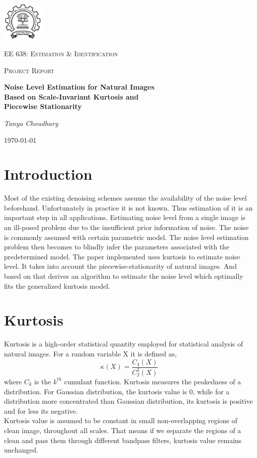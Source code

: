 \documentclass[11pt]{article}
\begin{document}
\begin{titlepage}
	\centering
	\includegraphics[width=0.15\textwidth]{IITBlogo.png}\par\vspace{1cm}
	{\scshape\LARGE EE 638: Estimation \& Identification \par}
	\vspace{1cm}
	{\scshape\Large Project Report\par}
	\vspace{1.5cm}
	{\huge\bfseries Noise Level Estimation for Natural Images\\ Based on Scale-Invariant Kurtosis and\\ Piecewise Stationarity \par}
	\vspace{2cm}
	{\Large\itshape Tanya Choudhary\par}

	\vfill

	{\large \today\par}
\end{titlepage}
\section{Introduction}
Most of the existing denoising schemes assume the availability of the noise level beforehand. Unfortunately in practice it is not known. Thus estimation of it is an important step in all applications.
Estimating noise level from a single image is an ill-posed problem due to the insufficient prior information of noise. The noise is commonly assumed with certain parametric model. The noise level estimation problem then becomes to blindly infer the parameters associated with the predetermined model. The paper \cite{dong} implemented uses kurtosis to estimate noise level. It takes into account the piecewise-stationarity of natural images. And based on that derives an algorithm to estimate the noise level which optimally fits the generalized kurtosis model.

\section{Kurtosis}
Kurtosis is a high-order statistical quantity employed for statistical analysis of natural images. For a random variable X it is defined as,
 $$\kappa(X) = \frac{C_4(X)}{C_2^2(X)}$$
where $C_k$ is the $k^{th}$ cumulant function. Kurtosis measures the peakedness of a distribution. For Gaussian distribution, the kurtosis value is 0, while for a distribution more concentrated than Gaussian distribution, its kurtosis is positive and for less its negative. \\
Kurtosis value is assumed to be constant in small non-overlapping regions of clean image, throughout all scales. That means if we separate the regions of a clean and pass them through different bandpass filters, kurtosis value remains unchanged.
\end{document}
